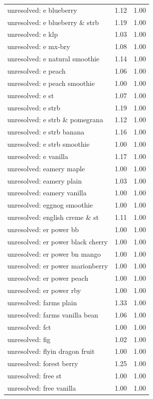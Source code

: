 \begin{table}
\begin{tabular}{lrr}
unresolved: e blueberry & 1.12 & 1.00 \\
unresolved: e blueberry \& strb & 1.19 & 1.00 \\
unresolved: e klp & 1.03 & 1.00 \\
unresolved: e mx-bry & 1.08 & 1.00 \\
unresolved: e natural smoothie & 1.14 & 1.00 \\
unresolved: e peach & 1.06 & 1.00 \\
unresolved: e peach smoothie & 1.00 & 1.00 \\
unresolved: e st & 1.07 & 1.00 \\
unresolved: e strb & 1.19 & 1.00 \\
unresolved: e strb \& pomegrana & 1.12 & 1.00 \\
unresolved: e strb banana & 1.16 & 1.00 \\
unresolved: e strb smoothie & 1.00 & 1.00 \\
unresolved: e vanilla & 1.17 & 1.00 \\
unresolved: eamery maple & 1.00 & 1.00 \\
unresolved: eamery plain & 1.03 & 1.00 \\
unresolved: eamery vanilla & 1.00 & 1.00 \\
unresolved: eggnog smoothie & 1.00 & 1.00 \\
unresolved: english creme \& st & 1.11 & 1.00 \\
unresolved: er power bb & 1.00 & 1.00 \\
unresolved: er power black cherry & 1.00 & 1.00 \\
unresolved: er power bn mango & 1.00 & 1.00 \\
unresolved: er power marionberry & 1.00 & 1.00 \\
unresolved: er power peach & 1.00 & 1.00 \\
unresolved: er power rby & 1.00 & 1.00 \\
unresolved: farms plain & 1.33 & 1.00 \\
unresolved: farms vanilla bean & 1.06 & 1.00 \\
unresolved: fct & 1.00 & 1.00 \\
unresolved: fig & 1.02 & 1.00 \\
unresolved: flyin dragon fruit & 1.00 & 1.00 \\
unresolved: forest berry & 1.25 & 1.00 \\
unresolved: free st & 1.00 & 1.00 \\
unresolved: free vanilla & 1.00 & 1.00 \\

\end{tabular}
\end{table}

